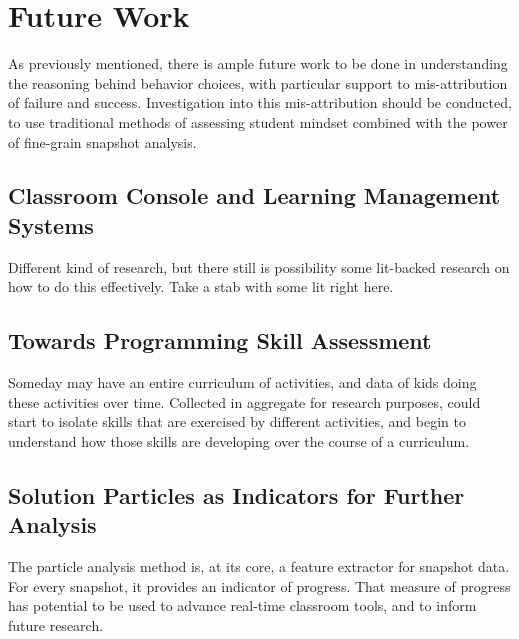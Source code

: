 
\section{Future Work}
\label{sec:futurework}

As previously mentioned, there is ample future work to be done in understanding the reasoning behind behavior choices, with particular support to mis-attribution of failure and success. Investigation into this mis-attribution should be conducted, to use traditional methods of assessing student mindset combined with the power of fine-grain snapshot analysis. 

\subsection{Classroom Console and Learning Management Systems}
Different kind of research, but there still is possibility some lit-backed research on how to do this effectively. Take a stab with some lit right here.

\subsection{Towards Programming Skill Assessment}
Someday may have an entire curriculum of activities, and data of kids doing these activities over time. Collected in aggregate for research purposes, could start to isolate skills that are exercised by different activities, and begin to understand how those skills are developing over the course of a curriculum.

\subsection{Solution Particles as Indicators for Further Analysis}
The particle analysis method is, at its core, a feature extractor for snapshot data. For every snapshot, it provides an indicator of progress. That measure of progress has potential to be used to advance real-time classroom tools, and to inform future research. 

